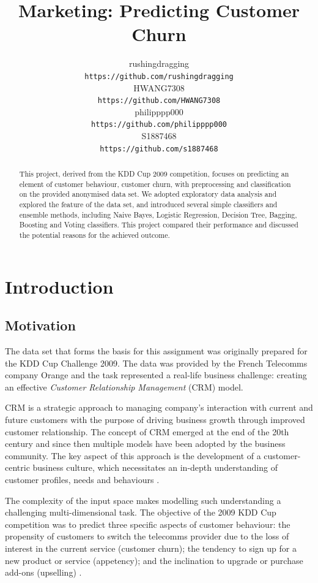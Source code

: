 \documentclass{article}
\title{Marketing: Predicting Customer Churn}
\author{
  rushingdragging\\
   \texttt{https://github.com/rushingdragging} \\
  \And
  HWANG7308\\
   \texttt{https://github.com/HWANG7308} \\
 \And
  philipppp000\\
   \texttt{https://github.com/philipppp000} \\
 \And
  S1887468\\
   \texttt{https://github.com/s1887468}\\
}
\begin{document}
\maketitle

\begin{abstract}
 
This project, derived from the KDD Cup 2009 competition, focuses on predicting an element of customer behaviour, customer churn, with preprocessing and classification on the provided anonymised data set.
We adopted exploratory data analysis and explored the feature of the data set, and introduced several simple classifiers and ensemble methods, including Naive Bayes, Logistic Regression, Decision Tree, Bagging, Boosting and Voting classifiers.
This project compared their performance and discussed the potential reasons for the achieved outcome.
\end{abstract}

\section{Introduction}
\subsection{Motivation}
The data set that forms the basis for this assignment was originally prepared for the KDD Cup Challenge 2009.
The data was provided by the French Telecomms company Orange and the task represented a real-life business challenge: creating an effective \emph{Customer Relationship Management} (CRM) model.

CRM is a strategic approach to managing company's interaction with current and future customers with the purpose of driving business growth through improved customer relationship.
The concept of CRM emerged at the end of the 20th century and since then multiple models have been adopted by the business community.
The key aspect of this approach is the development of a customer-centric business culture, which necessitates an in-depth understanding of customer profiles, needs and behaviours \cite{buttle2009customer}.

The complexity of the input space makes modelling such understanding a challenging multi-dimensional task.
The objective of the 2009 KDD Cup competition was to predict three specific aspects of customer behaviour: the propensity of customers to switch the telecomms provider due to the loss of interest in the current service (customer churn); the tendency to sign up for a new product or service (appetency); and the inclination to upgrade or purchase add-ons (upselling) \cite{guyon2009analysis}.
\end{document}
